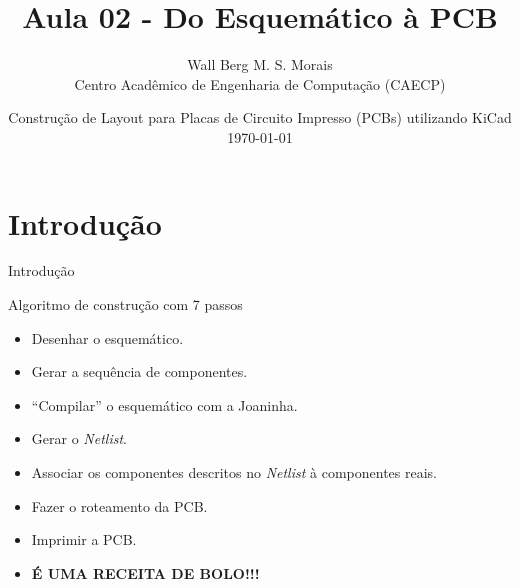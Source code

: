 \documentclass{beamer}
\title[Aula 02 - Confecção de PCB]{Aula 02 - Do Esquemático à PCB}
\author[CAECP]{Wall Berg M. S. Morais\\Centro Acadêmico de Engenharia de Computação (CAECP)}
\institute[UTFPR] 
{
  Departamento de Informática - DAINF \\
  Universidade Tecnológica Federal do Paraná
}
\date[\today]{Construção de Layout para Placas de Circuito Impresso (PCBs) utilizando KiCad\\\today}
\begin{document}
\begin{frame}
  \titlepage
\end{frame}

\begin{frame}
	\tableofcontents
\end{frame}

\section{Introdução}
\begin{frame}{Introdução}
	\begin{block}{Algoritmo de construção com 7 passos}
		\begin{itemize}
			\item Desenhar o esquemático.
			\item Gerar a sequência de componentes.
			\item ``Compilar'' o esquemático com a Joaninha.
			\pause
			\item Gerar o \textit{Netlist}.
			\item Associar os componentes descritos no \textit{Netlist} à componentes reais.
			\item Fazer o roteamento da PCB.
			\item Imprimir a PCB.
			\pause
			\item \textbf{É UMA RECEITA DE BOLO!!!}
		\end{itemize}
	\end{block}	
\end{frame}
\end{document}
